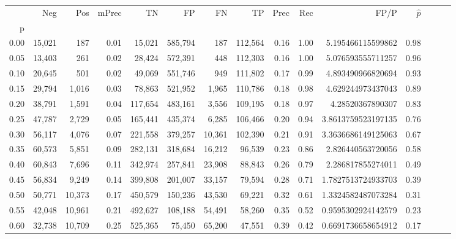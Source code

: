 \begin{tabular}{rrrrrrrrrrrrrrr}
\toprule
{} &     Neg &     Pos & mPrec &       TN &       FP &       FN &       TP &  Prec &   Rec &                  FP/P & $\hat{p}$ \\
p    &         &         &       &          &          &          &          &       &       &                       &           \\
\midrule
0.00 &  15,021 &     187 &  0.01 &   15,021 &  585,794 &      187 &  112,564 &  0.16 &  1.00 &     5.195466115599862 &      0.98 \\
0.05 &  13,403 &     261 &  0.02 &   28,424 &  572,391 &      448 &  112,303 &  0.16 &  1.00 &     5.076593555711257 &      0.96 \\
0.10 &  20,645 &     501 &  0.02 &   49,069 &  551,746 &      949 &  111,802 &  0.17 &  0.99 &     4.893490966820694 &      0.93 \\
0.15 &  29,794 &   1,016 &  0.03 &   78,863 &  521,952 &    1,965 &  110,786 &  0.18 &  0.98 &     4.629244973437043 &      0.89 \\
0.20 &  38,791 &   1,591 &  0.04 &  117,654 &  483,161 &    3,556 &  109,195 &  0.18 &  0.97 &      4.28520367890307 &      0.83 \\
0.25 &  47,787 &   2,729 &  0.05 &  165,441 &  435,374 &    6,285 &  106,466 &  0.20 &  0.94 &    3.8613759523197135 &      0.76 \\
0.30 &  56,117 &   4,076 &  0.07 &  221,558 &  379,257 &   10,361 &  102,390 &  0.21 &  0.91 &    3.3636686149125063 &      0.67 \\
0.35 &  60,573 &   5,851 &  0.09 &  282,131 &  318,684 &   16,212 &   96,539 &  0.23 &  0.86 &     2.826440563720056 &      0.58 \\
0.40 &  60,843 &   7,696 &  0.11 &  342,974 &  257,841 &   23,908 &   88,843 &  0.26 &  0.79 &     2.286817855274011 &      0.49 \\
0.45 &  56,834 &   9,249 &  0.14 &  399,808 &  201,007 &   33,157 &   79,594 &  0.28 &  0.71 &    1.7827513724933703 &      0.39 \\
0.50 &  50,771 &  10,373 &  0.17 &  450,579 &  150,236 &   43,530 &   69,221 &  0.32 &  0.61 &    1.3324582487073284 &      0.31 \\
0.55 &  42,048 &  10,961 &  0.21 &  492,627 &  108,188 &   54,491 &   58,260 &  0.35 &  0.52 &    0.9595302924142579 &      0.23 \\
0.60 &  32,738 &  10,709 &  0.25 &  525,365 &   75,450 &   65,200 &   47,551 &  0.39 &  0.42 &    0.6691736658654912 &      0.17 \\

\end{tabular}
